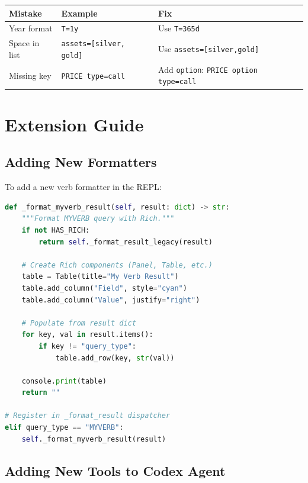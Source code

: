 \documentclass[12pt,oneside,openany]{book}
\begin{document}
\begin{table}[H]
\centering
\begin{tabular}{|l|l|l|}
\toprule
\textbf{Mistake} & \textbf{Example} & \textbf{Fix} \\
\midrule
Year format & \texttt{T=1y} & Use \texttt{T=365d} \\
Space in list & \texttt{assets=[silver, gold]} & Use \texttt{assets=[silver,gold]} \\
Missing key & \texttt{PRICE type=call} & Add \texttt{option}: \texttt{PRICE option type=call} \\
\bottomrule
\end{tabular}
\end{table}

\chapter{Extension Guide}

\section{Adding New Formatters}

To add a new verb formatter in the REPL:

\begin{lstlisting}[language=Python]
def _format_myverb_result(self, result: dict) -> str:
    """Format MYVERB query with Rich."""
    if not HAS_RICH:
        return self._format_result_legacy(result)

    # Create Rich components (Panel, Table, etc.)
    table = Table(title="My Verb Result")
    table.add_column("Field", style="cyan")
    table.add_column("Value", justify="right")

    # Populate from result dict
    for key, val in result.items():
        if key != "query_type":
            table.add_row(key, str(val))

    console.print(table)
    return ""

# Register in _format_result dispatcher
elif query_type == "MYVERB":
    self._format_myverb_result(result)
\end{lstlisting}

\section{Adding New Tools to Codex Agent}
\end{document}
